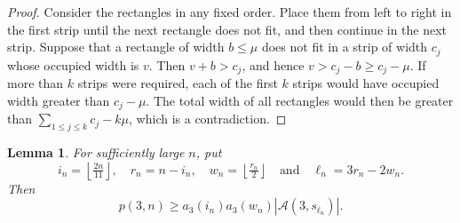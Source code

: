 \documentclass[12pt,a4paper]{amsart}
\numberwithin{equation}{section}
\theoremstyle{plain}
\newtheorem{lm}[thm]{Lemma}
\theoremstyle{definition}
\theoremstyle{remark}
\begin{document}
\begin{proof}
Consider the rectangles in any fixed order. Place them from left to right in the first strip until the next rectangle does not fit, and then continue in the next strip. Suppose that a rectangle of width $b\le  \mu$ does not fit in a strip of width $c_j$ whose occupied width is $v$. Then $v+b>c_j$, and hence $v>c_j-b\geq c_j-\mu$. If more than $k$ strips were required, each of the first $k$ strips would have occupied width greater than $c_j-\mu$. The total width of all rectangles would then be greater than $\sum_{1\le  j\le  k}c_j-k\mu$, which is a contradiction.
\end{proof}

\begin{lm}\label{lm: lower construction p3}
For sufficiently large $n$, put
$$
i_n=\left\lfloor\tfrac{2n}{11}\right\rfloor,
\quad
r_n=n-i_n,
\quad
w_n=\left\lfloor\tfrac{r_n}{2}\right\rfloor
\quad\text{and}\quad
\ell_n=3r_n-2w_n.
$$
Then
$$
p(3,n)
\ge a_3(i_n)a_3(w_n)|\mathcal{A}(3,s_{\ell_n})|.
$$
\end{lm}
\end{document}
